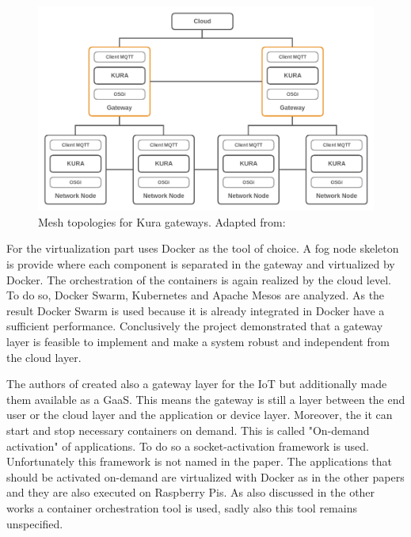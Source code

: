 \begin{figure}[H]
    \centering
    \includegraphics[width=\textwidth]{resources/images/kura_topologies.png}
    \caption[Mesh topologies for Kura gateways]{Mesh topologies for Kura gateways. Adapted from: \autocite[p. 4]{Bellavista:2017}}
    \label{fig:kura_gateway_topologies}
\end{figure}

For the virtualization part \autocite{Bellavista:2017} uses Docker as the tool of choice.
A fog node skeleton is provide where each component is separated in the gateway and virtualized by Docker.\autocite[cf.][p. 6]{Bellavista:2017}
The orchestration of the containers is again realized by the cloud level.
To do so, Docker Swarm, Kubernetes and Apache Mesos are analyzed.\autocite[cf.][p. 6 f.]{Bellavista:2017}
As the result Docker Swarm is used because it is already integrated in Docker have a sufficient performance.\autocite[cf.][p. 7]{Bellavista:2017}
Conclusively the project demonstrated that a gateway layer is feasible to implement and make a system robust and independent from the cloud layer.

The authors of \autocite{Morabito:2016} created also a gateway layer for the \ac{IoT} but additionally made them available as a \ac{GaaS}.
This means the gateway is still a layer between the end user or the cloud layer and the application or device layer.
Moreover, the it can start and stop necessary containers on demand.
This is called "On-demand activation" of applications.\autocite[cf.][p. 3]{Morabito:2016}
To do so a socket-activation framework is used.\autocite[cf.][p. 3]{Morabito:2016}
Unfortunately this framework is not named in the paper.
The applications that should be activated on-demand are virtualized with Docker as in the other papers and they are also executed on Raspberry Pis.
As also discussed in the other works a container orchestration tool is used, sadly also this tool remains unspecified.

